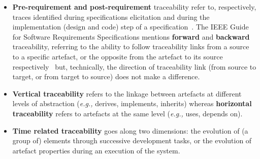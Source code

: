 \begin{itemize}
	\item \textbf{Pre-requirement and post-requirement} traceability refer to, respectively, traces identified during specifications elicitation and during the implementation (design and code) step of a specification~\cite{gotel1994}.
	The IEEE Guide for Software Requirements Specifications mentions \textbf{forward} and \textbf{backward} traceability, referring to the ability to follow traceability links from a source to a specific artefact, or the opposite from the artefact to its source respectively~\cite{ieeeglossary-req} but, technically, the direction of traceability link (from source to target, or from target to source) does not make a difference.
	
	\item \textbf{Vertical traceability} refers to the linkage between artefacts at different levels of abstraction (\textit{e.g.,} derives, implements, inherits) whereas \textbf{horizontal traceability} refers to artefacts at the same level (\textit{e.g.,} uses, depends on). 
	
	\item \textbf{Time related traceability} goes along two dimensions: the evolution of (a group of) elements through successive development tasks, or the evolution of artefact properties during an execution of the system. %
\end{itemize}


